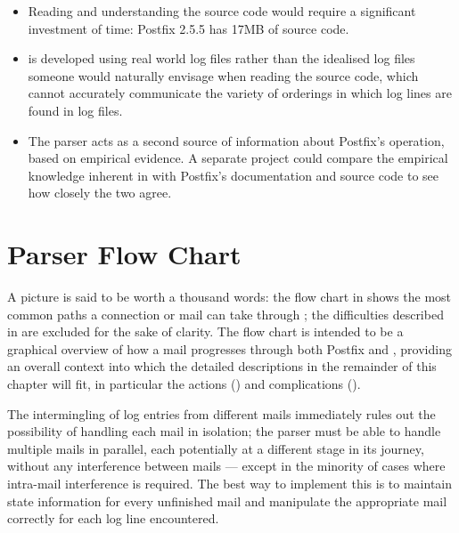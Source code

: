 \begin{itemize}

    \item Reading and understanding the source code would require a
        significant investment of time: Postfix 2.5.5 has 17MB of source
        code.

    \item \parsername{} is developed using real world log files rather than
        the idealised log files someone would naturally envisage when
        reading the source code, which cannot accurately communicate the
        variety of orderings in which log lines are found in log files.

    \item The parser acts as a second source of information about Postfix's
        operation, based on empirical evidence.  A separate project could
        compare the empirical knowledge inherent in \parsername{} with
        Postfix's documentation and source code to see how closely the two
        agree.

\end{itemize}



\section{Parser Flow Chart}

\label{flow chart}

A picture is said to be worth a thousand words: the flow chart in
 shows the most common paths a connection or
mail can take through \parsername{}; the difficulties described in
 are excluded for the sake of clarity.  The flow
chart is intended to be a graphical overview of how a mail progresses
through both Postfix and \parsername{}, providing an overall context into
which the detailed descriptions in the remainder of this chapter will fit,
in particular the actions () and
complications ().


The intermingling of log entries from different mails immediately rules out
the possibility of handling each mail in isolation; the parser must be able
to handle multiple mails in parallel, each potentially at a different stage
in its journey, without any interference between mails --- except in the
minority of cases where intra-mail interference is required.  The best way
to implement this is to maintain state information for every unfinished
mail and manipulate the appropriate mail correctly for each log line
encountered.

